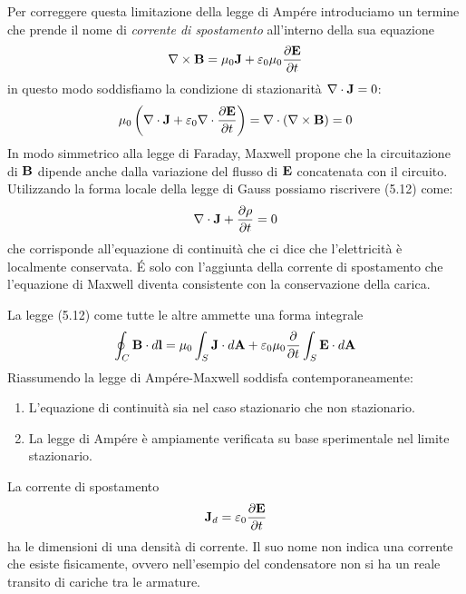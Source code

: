 Per correggere questa limitazione della legge di Amp\'ere introduciamo un termine che prende il nome di \textit{corrente di spostamento} all'interno della sua equazione
\begin{equation}
	\nabla \times \bold{B} = \mu_0 \bold{J} + \varepsilon_0 \mu_0 \frac{\partial \bold{E}}{\partial t} 
\end{equation}
in questo modo soddisfiamo la condizione di stazionarit\`a $\nabla \cdot \bold{J} = 0$:
\begin{equation*}
	\mu_0 \left(\nabla \cdot \bold{J} + \varepsilon_0 \nabla \cdot \frac{\partial \bold{E}}{\partial t} \right)  = \nabla \cdot (\nabla \times \bold{B}) = 0
\end{equation*}
In modo simmetrico alla legge di Faraday, Maxwell propone che la circuitazione di $\bold{B}$ dipende anche dalla variazione del flusso di $\bold{E}$ concatenata con il circuito. Utilizzando la forma locale della legge di Gauss possiamo riscrivere (5.12) come:
\begin{equation}
	\nabla \cdot \bold{J} + \frac{\partial \rho}{\partial t} = 0
\end{equation}
che corrisponde all'equazione di continuit\`a che ci dice che l'elettricit\`a \`e localmente conservata. \'E solo con l'aggiunta della corrente di spostamento che l'equazione di Maxwell diventa consistente con la conservazione della carica.

La legge (5.12) come tutte le altre ammette una forma integrale 
\begin{equation}
	\oint_{C} \bold{B} \cdot d \bold{l} = \mu_0 \int_{S} \bold{J} \cdot d \bold{A} + \varepsilon_0 \mu_0 \frac{\partial }{\partial t} \int_{S} \bold{E} \cdot d \bold{A} 
\end{equation}
Riassumendo la legge di Amp\'ere-Maxwell soddisfa contemporaneamente:
\begin{enumerate}
	\item L'equazione di continuit\`a sia nel caso stazionario che non stazionario.
	\item La legge di Amp\'ere \`e ampiamente verificata su base sperimentale nel limite stazionario.
\end{enumerate}
La corrente di spostamento 
\begin{equation}
	\bold{J}_d =  \varepsilon_0 \frac{\partial \bold{E}}{\partial t}
\end{equation}
ha le dimensioni di una densit\`a di corrente. Il suo nome non indica una corrente che esiste fisicamente, ovvero nell'esempio del condensatore non si ha un reale transito di cariche tra le armature.

